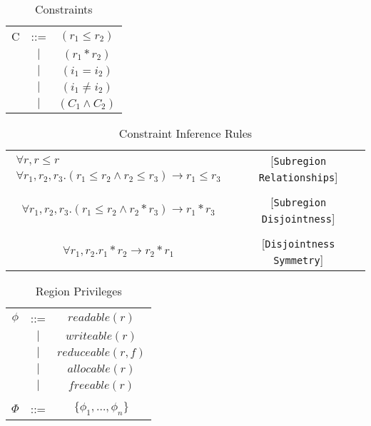 \documentclass{article}
\begin{document}
\begin{table*}
\centering
{\small
\begin{tabular}{ccc}

C & ::= & $(r_1 \le r_2)$ \\
  &$\mid$&$(r_1 * r_2)$ \\
  &$\mid$&$(i_1 = i_2)$ \\
  &$\mid$&$(i_1 \ne i_2)$ \\
  &$\mid$&$(C_1 \wedge C_2)$ \\
\end{tabular}
}
\caption{Constraints}
\end{table*}


\begin{table*}
\centering
{\small
\begin{tabular}{cc}
%
%
\begin{math}
\begin{array}{c}
\forall r, r \le r \\
\forall r_1, r_2, r_3. (r_1 \le r_2 \wedge r_2 \le r_3) \rightarrow r_1 \le r_3
\end{array}
\end{math} & [{\tt Subregion Relationships}] \\
\\
\begin{math}
\forall r_1, r_2, r_3. (r_1 \le r_2 \wedge r_2 * r_3) \rightarrow r_1 * r_3
\end{math} & [{\tt Subregion Disjointness}] \\
\\
\begin{math}
\forall r_1, r_2. r_1 * r_2 \rightarrow r_2 * r_1
\end{math} & [{\tt Disjointness Symmetry}]
\end{tabular}
}
\caption{Constraint Inference Rules}
\end{table*}


\begin{table*}
\centering
{\small
\begin{tabular}{ccc}

$\phi$ & ::= & $readable(r)$ \\
  &$\mid$&$writeable(r)$ \\
  &$\mid$&$reduceable(r,f)$ \\
  &$\mid$&$allocable(r)$ \\
  &$\mid$&$freeable(r)$ \\
\\
$\Phi$ & ::= & $\{ \phi_1, \ldots, \phi_n \}$
\end{tabular}
}
\caption{Region Privileges}
\end{table*}
\end{document}
